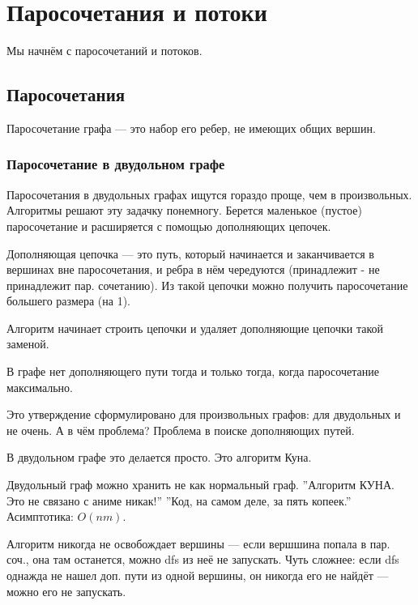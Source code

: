 \section{Паросочетания и потоки}

Мы начнём с паросочетаний и потоков.

\subsection{Паросочетания}
Паросочетание графа --- это набор его ребер, не имеющих общих вершин.

\subsubsection{Паросочетание в двудольном графе}
Паросочетания в двудольных графах ищутся гораздо проще, чем в произвольных.
Алгоритмы решают эту задачку понемногу. 
Берется маленькое (пустое) паросочетание и расширяется с помощью дополняющих цепочек.

Дополняющая цепочка --- это путь, который начинается и заканчивается в вершинах вне паросочетания, и ребра в нём чередуются (принадлежит - не принадлежит пар. сочетанию).
Из такой цепочки можно получить паросочетание большего размера (на 1).

Алгоритм начинает строить цепочки и удаляет дополняющие цепочки такой заменой.
\begin{theorem}
    В графе нет дополняющего пути тогда и только тогда, когда паросочетание максимально.
\end{theorem}
Это утверждение сформулировано для произвольных графов: для двудольных и не очень.
А в чём проблема? 
Проблема в поиске дополняющих путей.

В двудольном графе это делается просто. 
Это алгоритм Куна.

Двудольный граф можно хранить не как нормальный граф.
''Алгоритм КУНА. Это не связано с аниме никак!''
''Код, на самом деле, за пять копеек.''
Асимптотика: $O(nm)$.




Алгоритм никогда не освобождает вершины --- если вершшина попала в пар. соч., она там останется, можно dfs из неё не запускать.
Чуть сложнее: если dfs однажда не нашел доп. пути из одной вершины, он никогда его не найдёт --- можно его не запускать.


